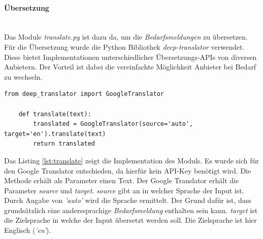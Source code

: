 \paragraph{Übersetzung}\mbox{}\\
Das Module \emph{translate.py} ist dazu da, um die \emph{Bedarfsmeldungen} zu übersetzen. Für die Übersetzung wurde die Python Bibliothek \emph{deep-translator} verwendet. Diese bietet Implementationen unterschiedlicher Übersetzungs-APIs von diversen Anbietern. Der Vorteil ist dabei die vereinfachte Möglichkeit Anbieter bei Bedarf zu wechseln.
\begin{lstlisting}[caption={Implementation des Moduls \emph{translate.py}}, label=lst:translate]
	from deep_translator import GoogleTranslator
	
	def translate(text):
		translated = GoogleTranslator(source='auto', target='en').translate(text)
		return translated
\end{lstlisting}
Das Listing \ref{lst:translate} zeigt die Implementation des Moduls. Es wurde sich für den Google Translator entschieden, da hierfür kein API-Key benötigt wird. Die Methode erhält als Parameter einen Text. Der Google Translator erhält die Parameter \emph{source} und \emph{target}. \emph{source} gibt an in welcher Sprache der Input ist. Durch Angabe von \emph{'auto'} wird die Sprache ermittelt. Der Grund dafür ist, dass grundsätzlich eine anderssprachige \emph{Bedarfsmeldung} enthalten sein kann. \emph{target} ist die Zielsprache in welche der Input übersetzt werden soll. Die Zielsprache ist hier Englisch (\emph{'en'}).
